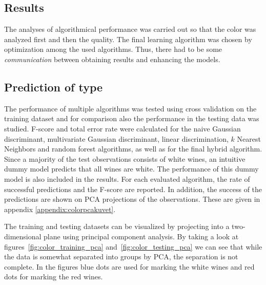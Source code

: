 \documentclass[twoside]{article}
\begin{document}
\begin{multicols}{2}


\section{Results}

The analyses of algorithmical performance was carried out so that the color was analyzed first and then the quality. The final learning algorithm
was chosen by optimization among the used algorithms. Thus, there had to be some \emph{communication} between obtaining results and enhancing the models.

\subsection{Prediction of type}

The performance of multiple algorithms was tested using cross validation on the training dataset and for comparison also the performance in the testing data was studied.
F-score and total error rate were calculated for the naive Gaussian discriminant, multivariate Gaussian discriminant, linear discrimination, $k$ Nearest Neighbors and random forest
algorithms, as well as for the final hybrid algorithm.
Since a majority of the test observations consists of white wines, an intuitive dummy model predicts that all wines are white. The performance of this dummy model
is also included in the results.
For each evaluated algorithm, the rate of successful predictions and the F-score are reported. In addition, the success of the predictions are shown on PCA projections
of the observations. These are given in appendix \ref{appendix:colorpcakuvet}.

The training and testing datasets can be visualized by projecting into a two-dimensional plane using principal component analysis. By taking a look at
figures~\ref{fig:color_training_pca} and~\ref{fig:color_testing_pca} we can see that while the data is somewhat separated into groups by PCA,
the separation is not complete. In the figures blue dots are used for marking the white wines and red dots for marking the red wines.


\end{multicols}
\end{document}
